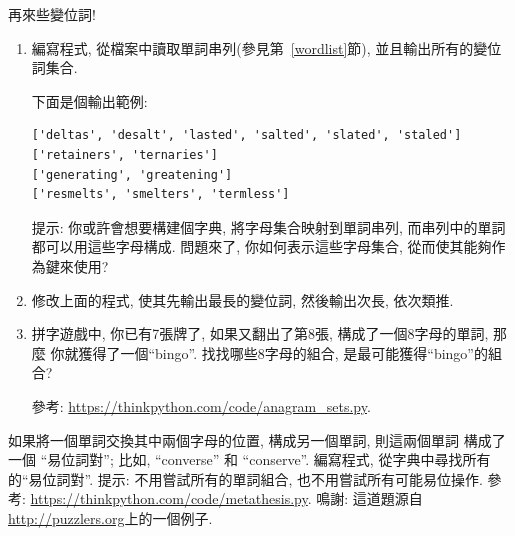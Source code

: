 \documentclass[10pt]{book}
\begin{document}
\begin{exercise}
\label{anagrams}

再來些變位詞!

\begin{enumerate}

\item 編寫程式, 從檔案中讀取單詞串列(參見第~\ref{wordlist}節), 
並且輸出所有的變位詞集合. 

下面是個輸出範例:

\begin{verbatim}
['deltas', 'desalt', 'lasted', 'salted', 'slated', 'staled']
['retainers', 'ternaries']
['generating', 'greatening']
['resmelts', 'smelters', 'termless']
\end{verbatim}
%
提示: 你或許會想要構建個字典, 將字母集合映射到單詞串列, 
而串列中的單詞都可以用這些字母構成. 問題來了, 你如何表示這些字母集合, 
從而使其能夠作為鍵來使用?

\item 修改上面的程式, 使其先輸出最長的變位詞, 然後輸出次長, 依次類推. 

\item 拼字遊戲中, 你已有7張牌了, 如果又翻出了第8張, 構成了一個8字母的單詞, 那麼
你就獲得了一個``bingo''. 找找哪些8字母的組合, 是最可能獲得``bingo''的組合?


參考: \url{https://thinkpython.com/code/anagram_sets.py}.

\end{enumerate}
\end{exercise}

\begin{exercise}
如果將一個單詞交換其中兩個字母的位置, 構成另一個單詞, 則這兩個單詞
構成了一個 ``易位詞對''; 比如, ``converse'' 和 ``conserve''.  
編寫程式, 從字典中尋找所有的``易位詞對''.
提示: 不用嘗試所有的單詞組合, 也不用嘗試所有可能易位操作. 
參考:
\url{https://thinkpython.com/code/metathesis.py}.  
鳴謝: 這道題源自\url{http://puzzlers.org}上的一個例子. 
\end{exercise}
\end{document}
